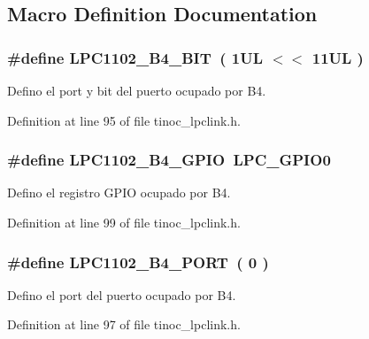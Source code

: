 \subsection{Macro Definition Documentation}
\subsubsection[{\texorpdfstring{L\+P\+C1102\+\_\+\+B4\+\_\+\+B\+IT}{LPC1102_B4_BIT}}]{\setlength{\rightskip}{0pt plus 5cm}\#define L\+P\+C1102\+\_\+\+B4\+\_\+\+B\+IT~( 1\+U\+L $<$$<$ 11\+U\+L )}\hypertarget{group___p_i_n_b4_gabd8ff8e5626973a20825ed09a23f6c6e}{}\label{group___p_i_n_b4_gabd8ff8e5626973a20825ed09a23f6c6e}


Defino el port y bit del puerto ocupado por B4. 



Definition at line 95 of file tinoc\+\_\+lpclink.\+h.

\subsubsection[{\texorpdfstring{L\+P\+C1102\+\_\+\+B4\+\_\+\+G\+P\+IO}{LPC1102_B4_GPIO}}]{\setlength{\rightskip}{0pt plus 5cm}\#define L\+P\+C1102\+\_\+\+B4\+\_\+\+G\+P\+IO~L\+P\+C\+\_\+\+G\+P\+I\+O0}\hypertarget{group___p_i_n_b4_gacbcccf71d8c04a772bba72aeca46284a}{}\label{group___p_i_n_b4_gacbcccf71d8c04a772bba72aeca46284a}


Defino el registro G\+P\+IO ocupado por B4. 



Definition at line 99 of file tinoc\+\_\+lpclink.\+h.

\subsubsection[{\texorpdfstring{L\+P\+C1102\+\_\+\+B4\+\_\+\+P\+O\+RT}{LPC1102_B4_PORT}}]{\setlength{\rightskip}{0pt plus 5cm}\#define L\+P\+C1102\+\_\+\+B4\+\_\+\+P\+O\+RT~( 0 )}\hypertarget{group___p_i_n_b4_gaa66d572d746828aa3a56c00b2388aa61}{}\label{group___p_i_n_b4_gaa66d572d746828aa3a56c00b2388aa61}


Defino el port del puerto ocupado por B4. 



Definition at line 97 of file tinoc\+\_\+lpclink.\+h.

